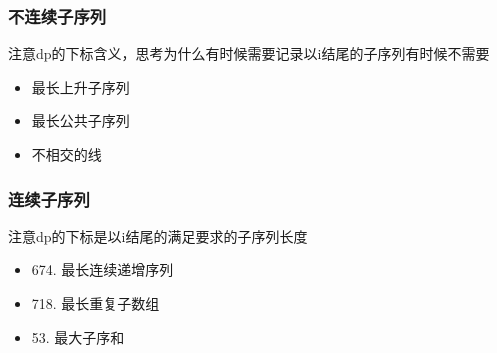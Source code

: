 \documentclass[a4paper,twoside]{ctexart}
\begin{document}
\subsubsection{不连续子序列}

注意dp的下标含义，思考为什么有时候需要记录以i结尾的子序列有时候不需要

\begin{itemize}
\item 最长上升子序列
\item 最长公共子序列
\item 不相交的线
\end{itemize}

\subsubsection{连续子序列}

注意dp的下标是以i结尾的满足要求的子序列长度

\begin{itemize}
\item 674. 最长连续递增序列
\item 718. 最长重复子数组
\item 53. 最大子序和
\end{itemize}
\end{document}
